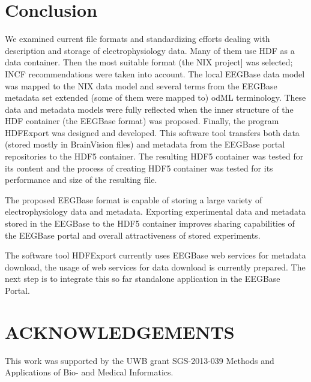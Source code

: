 \documentclass[conference]{IEEEtran}
\begin{document}
\section{Conclusion}
We examined current file formats and standardizing efforts dealing with description and storage of electrophysiology data. Many of them use HDF as a data container. Then the most suitable format (the NIX project] was selected; INCF recommendations were taken into account. The local EEGBase data model was mapped to the NIX data model and several terms from the EEGBase metadata set extended (some of them were mapped to) odML terminology. These data and metadata models were fully reflected when the inner structure of the HDF container (the EEGBase format) was proposed. Finally, the program HDFExport was designed and developed. This software tool transfers both data (stored mostly in BrainVision files) and metadata from the EEGBase portal repositories to the HDF5 container. The resulting HDF5 container was tested for its content and the process of creating HDF5 container was tested for its performance and size of the resulting file.

The proposed EEGBase format is capable of storing a large variety of electrophysiology data and metadata. Exporting experimental data and metadata stored in the EEGBase to the HDF5 container improves sharing capabilities of the EEGBase portal and overall attractiveness of stored experiments. 

The software tool HDFExport currently uses EEGBase web services for metadata download, the usage of web services for data download is currently prepared. The next step is to integrate this so far standalone application in the EEGBase Portal. 

\noindent

\section*{\uppercase{Acknowledgements}}
\noindent
This work was supported by the UWB grant SGS-2013-039 Methods and Applications of Bio- and Medical Informatics.



\end{document}
